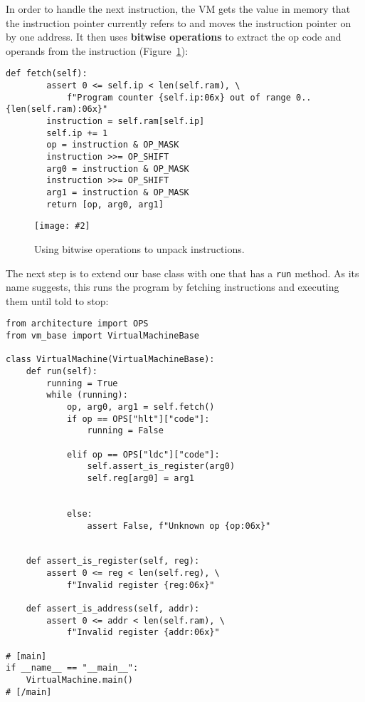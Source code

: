 \documentclass{scrbook}
\newcommand{\figref}[1]{Figure~\ref{#1}}
\newcommand{\figpdf}[4]{\begin{figure}%
\centering%
\texttt{[image: \#2]}%
\caption{#3}%
\label{#1}%
\end{figure}}
\newcommand{\glossref}[1]{\textbf{#1}}
\begin{document}
In order to handle the next instruction,
the VM gets the value in memory that the instruction pointer currently refers to
and moves the instruction pointer on by one address.
It then uses \glossref{bitwise operations}
to extract the op code and operands from the instruction
(\figref{vm-unpacking}):


\begin{lstlisting}[frame=single,frameround=tttt]
    def fetch(self):
        assert 0 <= self.ip < len(self.ram), \
            f"Program counter {self.ip:06x} out of range 0..{len(self.ram):06x}"
        instruction = self.ram[self.ip]
        self.ip += 1
        op = instruction & OP_MASK
        instruction >>= OP_SHIFT
        arg0 = instruction & OP_MASK
        instruction >>= OP_SHIFT
        arg1 = instruction & OP_MASK
        return [op, arg0, arg1]
\end{lstlisting}


\figpdf{vm-unpacking}{./vm/unpacking.pdf}{Using bitwise operations to unpack instructions.}{0.6}



The next step is to extend our base class with one that has a \texttt{run} method.
As its name suggests,
this runs the program by fetching instructions and executing them until told to stop:


\begin{lstlisting}[frame=single,frameround=tttt]
from architecture import OPS
from vm_base import VirtualMachineBase

class VirtualMachine(VirtualMachineBase):
    def run(self):
        running = True
        while (running):
            op, arg0, arg1 = self.fetch()
            if op == OPS["hlt"]["code"]:
                running = False

            elif op == OPS["ldc"]["code"]:
                self.assert_is_register(arg0)
                self.reg[arg0] = arg1


            else:
                assert False, f"Unknown op {op:06x}"


    def assert_is_register(self, reg):
        assert 0 <= reg < len(self.reg), \
            f"Invalid register {reg:06x}"

    def assert_is_address(self, addr):
        assert 0 <= addr < len(self.ram), \
            f"Invalid register {addr:06x}"

# [main]
if __name__ == "__main__":
    VirtualMachine.main()
# [/main]
\end{lstlisting}
\end{document}
